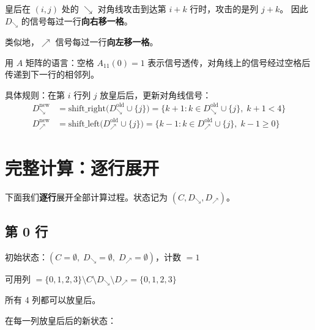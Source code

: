 \documentclass[12pt,a4paper]{article}
\begin{document}
\begin{warnbox}[关键：对角线信号每行移位]
皇后在 $(i,j)$ 处的 $\searrow$ 对角线攻击到达第 $i+k$ 行时，攻击的是列 $j+k$。
因此 $D_\searrow$ 的信号每过一行\textbf{向右移一格}。

类似地，$\nearrow$ 信号每过一行\textbf{向左移一格}。

用 $A$ 矩阵的语言：空格 $A_{11}(0) = 1$ 表示信号透传，对角线上的信号经过空格后传递到下一行的相邻列。
\end{warnbox}

具体规则：在第 $i$ 行列 $j$ 放皇后后，更新对角线信号：
\begin{align}
D_\searrow^{\text{new}} &= \text{shift\_right}\bigl(D_\searrow^{\text{old}} \cup \{j\}\bigr)
  = \{k+1 : k \in D_\searrow^{\text{old}} \cup \{j\},\; k+1 < 4\} \\
D_\nearrow^{\text{new}} &= \text{shift\_left}\bigl(D_\nearrow^{\text{old}} \cup \{j\}\bigr)
  = \{k-1 : k \in D_\nearrow^{\text{old}} \cup \{j\},\; k-1 \geq 0\}
\end{align}

\section{完整计算：逐行展开}

下面我们\textbf{逐行}展开全部计算过程。状态记为 $(C, D_\searrow, D_\nearrow)$。

\subsection{第 0 行}

\begin{stepbox}[第 0 行：初始状态]
初始状态：$(C=\emptyset,\; D_\searrow=\emptyset,\; D_\nearrow=\emptyset)$，计数 $= 1$

可用列 $= \{0,1,2,3\} \setminus C \setminus D_\searrow \setminus D_\nearrow = \{0,1,2,3\}$

所有 4 列都可以放皇后。
\end{stepbox}

在每一列放皇后后的新状态：
\end{document}

